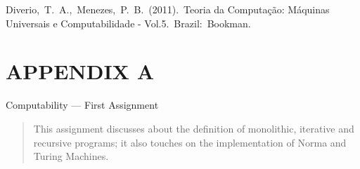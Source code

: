 \documentclass[12pt,fleqn]{article}
\begin{document}
\begin{thebibliography}{99}
\fontsize{11}{0}\selectfont
{}
Diverio, T. A., Menezes, P. B. (2011). Teoria da Computação: Máquinas Universais
e Computabilidade - Vol.5. Brazil: Bookman.
\end{thebibliography}
\vspace*{-0.1cm}
\section*{APPENDIX A}


\begin{center}
  Computability --- First Assignment
\end{center}

\def\abstractname{Abstract}%

\begin{abstract}
   This assignment discusses about the definition of monolithic, iterative and
   recursive programs; it also touches on the implementation of Norma and
   Turing Machines.
\end{abstract}

\end{document}
